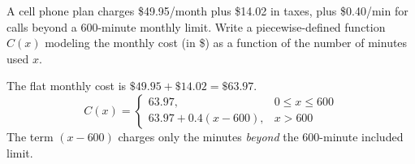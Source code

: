 \documentclass{ximera}
\begin{document}
\begin{problem}
A cell phone plan charges \$49.95/month plus \$14.02 in taxes, plus \$0.40/min for calls beyond a 600-minute monthly limit. Write a piecewise-defined function $C(x)$ modeling the monthly cost (in \$) as a function of the number of minutes used $x$.

\begin{solution}
The flat monthly cost is $\$49.95 + \$14.02 = \$63.97$.
$$C(x) = \begin{cases} 63.97, & 0 \leq x \leq 600\\ 63.97 + 0.4(x-600), & x > 600 \end{cases}$$
The term $(x-600)$ charges only the minutes \textit{beyond} the 600-minute included limit.
\end{solution}
\end{problem}
\end{document}
